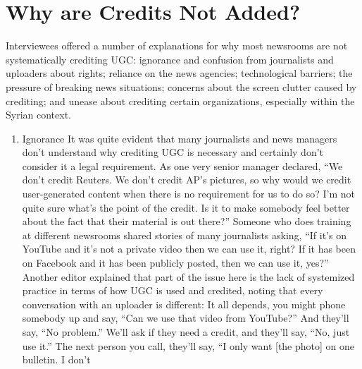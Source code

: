 \documentclass[symmetric, notoc, nobib]{towcenter-book}
\begin{document}
\section{Why are Credits Not Added?}
Interviewees offered a number of explanations for why most newsrooms
are not systematically crediting UGC: ignorance and confusion from journalists
and uploaders about rights; reliance on the news agencies; technological
barriers; the pressure of breaking news situations; concerns about
the screen clutter caused by crediting; and unease about crediting certain
organizations, especially within the Syrian context.
\begin{enumerate}
\item Ignorance
It was quite evident that many journalists and news managers don't understand
why crediting UGC is necessary and certainly don't consider it a
legal requirement. As one very senior manager declared, ``We don't credit
Reuters. We don't credit AP's pictures, so why would we credit user-generated
content when there is no requirement for us to do so? I'm not quite
sure what's the point of the credit. Is it to make somebody feel better about
the fact that their material is out there?''
Someone who does training at different newsrooms shared stories of many
journalists asking, ``If it's on YouTube and it's not a private video then we
can use it, right? If it has been on Facebook and it has been publicly posted,
then we can use it, yes?''
Another editor explained that part of the issue here is the lack of systemized
practice in terms of how UGC is used and credited, noting that every
conversation with an uploader is different:
It all depends, you might phone somebody up and say, ``Can we use
that video from YouTube?'' And they'll say, ``No problem.'' We'll ask if
they need a credit, and they'll say, ``No, just use it.'' The next person
you call, they'll say, ``I only want [the photo] on one bulletin. I don't


\end{enumerate}
\end{document}
